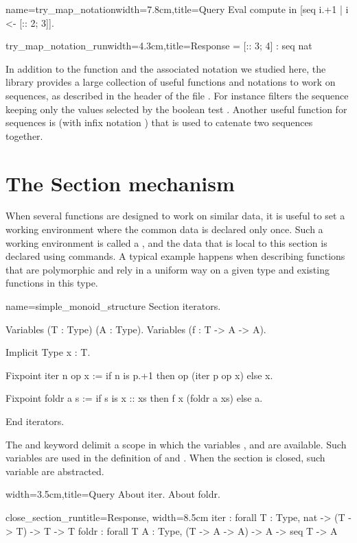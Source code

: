 \begin{coq}{name=try_map_notation}{width=7.8cm,title=Query}
Eval compute in [seq i.+1 | i <- [:: 2; 3]].
\end{coq}
\begin{coqout}{try_map_notation_run}{width=4.3cm,title=Response}
= [:: 3; 4] : seq nat
\end{coqout}
In addition to the function  and the associated notation
we studied here, the \mcbMC{} library
provides a large collection of useful functions and notations to work on
sequences, as described in the header of the file .  For
instance \C{[seq i <- s | p]} filters the sequence  keeping only
the values selected by the boolean test .
Another useful function for sequences is  (with infix notation \C{++})
that is used to catenate two sequences together.

\section{The Section mechanism}
When several functions are designed to work on similar data, it is
useful to set a working environment where the common data is declared
only once.  Such a working environment is called a , and
the data that is local to this section is declared using 
commands.  A typical example happens when describing functions that
are polymorphic and rely in a uniform way on a given type and existing
functions in this type.

\begin{coq}{name=simple_monoid_structure}{}
Section iterators.

Variables (T : Type) (A : Type).
Variables (f : T -> A -> A).

Implicit Type x : T.

Fixpoint iter n op x :=
  if n is p.+1 then op (iter p op x) else x.

Fixpoint foldr a s :=
  if s is x :: xs then f x (foldr a xs) else a.

End iterators.
\end{coq}
The  and  keyword delimit a scope in which
the variables ,  and  are available.  Such variables
are used in the definition of  and .  When the section is
closed, such variable are abstracted.

\begin{coq}{}{width=3.5cm,title=Query}
About iter.
About foldr.
$~$
\end{coq}
\begin{coqout}{close_section_run}{title=Response, width=8.5cm}
iter : forall T : Type, nat -> (T -> T) -> T -> T
foldr :
  forall T A : Type, (T -> A -> A) -> A -> seq T -> A
\end{coqout}

